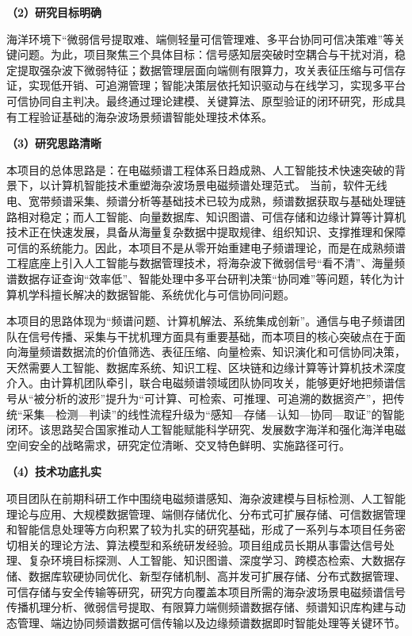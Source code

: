 {	\textbf{（2）研究目标明确} 
	

海洋环境下“微弱信号提取难、端侧轻量可信管理难、多平台协同可信决策难”等关键问题。为此，项目聚焦三个具体目标：信号感知层突破时空耦合与干扰对消，稳定提取强杂波下微弱特征；数据管理层面向端侧有限算力，攻关表征压缩与可信存证，实现低开销、可追溯管理；智能决策层依托知识驱动与在线学习，实现多平台可信协同自主判决。最终通过理论建模、关键算法、原型验证的闭环研究，形成具有工程验证基础的海杂波场景频谱智能处理技术体系。

	
	\textbf{（3）研究思路清晰} 
	
	本项目的总体思路是：在电磁频谱工程体系日趋成熟、人工智能技术快速突破的背景下，以计算机智能技术重塑海杂波场景电磁频谱处理范式。
	当前，软件无线电、宽带频谱采集、频谱分析等基础技术已较为成熟，频谱数据获取与基础处理链路相对稳定；而人工智能、向量数据库、知识图谱、可信存储和边缘计算等计算机技术正在快速发展，具备从海量复杂数据中提取规律、组织知识、支撑推理和保障可信的系统能力。因此，本项目不是从零开始重建电子频谱理论，而是在成熟频谱工程底座上引入人工智能与数据管理技术，将海杂波下微弱信号“看不清”、海量频谱数据存证查询“效率低”、智能处理中多平台研判决策“协同难”等问题，转化为计算机学科擅长解决的数据智能、系统优化与可信协同问题。
	
	本项目的思路体现为“频谱问题、计算机解法、系统集成创新”。通信与电子频谱团队在信号传播、采集与干扰机理方面具有重要基础，而本项目的核心突破点在于面向海量频谱数据流的价值筛选、表征压缩、向量检索、知识演化和可信协同决策，天然需要人工智能、数据库系统、知识工程、区块链和边缘计算等计算机技术深度介入。由计算机团队牵引，联合电磁频谱领域团队协同攻关，能够更好地把频谱信号从“被分析的波形”提升为“可计算、可检索、可推理、可追溯的数据资产”，把传统“采集—检测—判读”的线性流程升级为“感知—存储—认知—协同—取证”的智能闭环。该思路契合国家推动人工智能赋能科学研究、发展数字海洋和强化海洋电磁空间安全的战略需求，研究定位清晰、交叉特色鲜明、实施路径可行。


	\textbf{（4）技术功底扎实}
	
	项目团队在前期科研工作中围绕电磁频谱感知、海杂波建模与目标检测、人工智能理论与应用、大规模数据管理、端侧存储优化、分布式可扩展存储、可信数据管理和智能信息处理等方向积累了较为扎实的研究基础，形成了一系列与本项目任务密切相关的理论方法、算法模型和系统研发经验。项目组成员长期从事雷达信号处理、复杂环境目标探测、人工智能、知识图谱、深度学习、跨模态检索、大数据存储、数据库软硬协同优化、新型存储机制、高并发可扩展存储、分布式数据管理、可信存储与安全传输等研究，研究方向覆盖本项目所需的海杂波场景电磁频谱信号传播机理分析、微弱信号提取、有限算力端侧频谱数据存储、频谱知识库构建与动态管理、端边协同频谱数据可信传输以及边缘频谱数据即时智能处理等关键环节。
	
}
